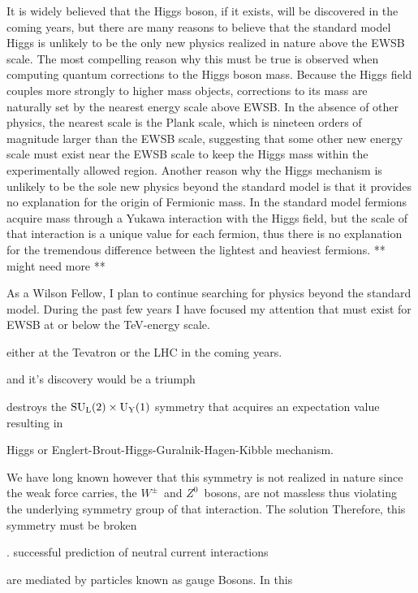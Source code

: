 \documentclass[12pt]{article}
\begin{document}
It is widely believed that the Higgs boson, if it exists, will be discovered in the coming years, but there are many reasons to believe that the standard model Higgs is unlikely to be the only new physics realized in nature above the EWSB scale. The most compelling reason why this must be true is observed when computing quantum corrections to the Higgs boson mass. Because the Higgs field couples more strongly to higher mass objects, corrections to its mass are naturally set by the nearest energy scale above EWSB. In the absence of other physics, the nearest scale is the Plank scale, which is nineteen orders of magnitude larger than the EWSB scale, suggesting that some other new energy scale must exist near the EWSB scale to keep the Higgs mass within the experimentally allowed region. Another reason why the Higgs mechanism is unlikely to be the sole new physics beyond the standard model is that it provides no explanation for the origin of Fermionic mass. In the standard model fermions acquire mass through a Yukawa interaction with the Higgs field, but the scale of that interaction is a unique value for each fermion, thus there is no explanation for the tremendous difference between the lightest and heaviest fermions. ** might need more **

As a Wilson Fellow, I plan to continue searching for physics beyond the standard model. During the past few years I have focused my attention that must exist for EWSB at or below the TeV-energy scale. 



 either at the Tevatron or the LHC in the coming years.





 and it's discovery would be a triumph  

destroys the $\rm{SU}_{\rm{L}}(2) \times \rm{U}_{\rm{Y}}(1)$ symmetry
 that acquires an expectation value resulting in 

Higgs or Englert-Brout-Higgs-Guralnik-Hagen-Kibble mechanism.

We have long known however that this symmetry is not realized in nature since the weak force carries, the $W^{\pm}$~and $Z^{0}$~bosons, are not massless thus violating the underlying symmetry group of that interaction. The solution 
Therefore, this symmetry must be broken  


. successful prediction of neutral current interactions 


are mediated by particles known as gauge Bosons. In this 
\end{document}
